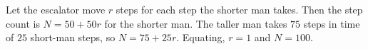 Let the escalator move $r$ steps for each step the shorter man takes. Then the step count is $N=50+50r$ for the shorter man. The taller man takes $75$ steps in time of $25$ short-man steps, so $N=75+25r$. Equating, $r=1$ and $N=\boxed{100}$.
